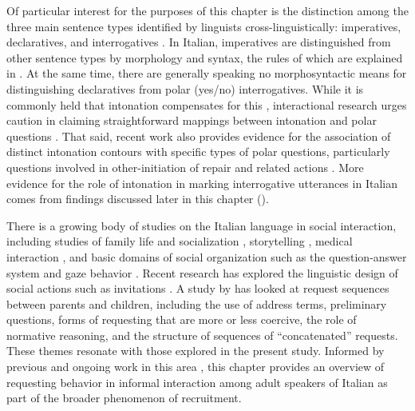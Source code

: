 \documentclass[output=paper,modfonts]{langscibook}
\begin{document}
Of particular interest for the purposes of this chapter is the distinction among the three main sentence types identified by linguists cross-linguistically: imperatives, declaratives, and interrogatives \citep{SadockZwicky1985,KönigSiemund2007,aikhenvald2010}. In Italian, imperatives are distinguished from other sentence types by morphology and syntax, the rules of which are explained in . At the same time, there are generally speaking no morphosyntactic means for distinguishing declaratives from polar (yes/no) interrogatives. While it is commonly held that intonation compensates for this \citep[e.g.][]{GiliFivelaEtAl2015}, interactional research urges caution in claiming straightforward mappings between intonation and polar questions \citep{Rossano2010}. That said, recent work also provides evidence for the association of distinct intonation contours with specific types of polar questions, particularly questions involved in other-initiation of repair and related actions \citep{Rossi2015c,Rossi2020b}. More evidence for the role of intonation in marking interrogative utterances in Italian comes from findings discussed later in this chapter (). 

There is a growing body of studies on the Italian language in social interaction, including studies of family life and socialization \citep[e.g.][]{Sterponi2003,Fatigante2007,ArcidiaconoPontecorvo2010,Pauletto2017}, storytelling \citep{MonzoniDrew2009}, medical interaction \citep[e.g.][]{PinoMortari2012,MortariPino2014}, and basic domains of social organization such as the question-answer system \citep{Rossano2010} and gaze behavior \citep{Rossano2012}. Recent research has explored the linguistic design of social actions such as invitations \citep{MarguttiGalatolo2018}. A study by \citet{GaleanoFasulo2009} has looked at request sequences between parents and children, including the use of address terms, preliminary questions, forms of requesting that are more or less coercive, the role of normative reasoning, and the structure of sequences of “concatenated” requests. These themes resonate with those explored in the present study. Informed by previous and ongoing work in this area \citep{Rossi2011,Rossi2012,Rossi2014,Rossi2015c,Rossi2015a,Rossi2017,Rossi2018,RossiZinken2016}, this chapter provides an overview of requesting behavior in informal interaction among adult speakers of Italian as part of the broader phenomenon of recruitment.
\end{document}
